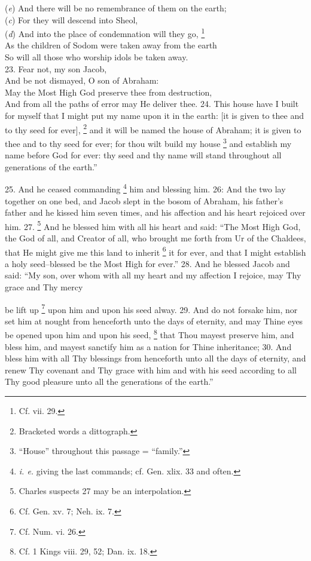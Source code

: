 (\emph{e}) And there will be no remembrance of them on the earth;\\
(\emph{c}) For they will descend into Sheol,\\
(\emph{d}) And into the place of condemnation will they go, \footnote{Cf. vii. 29.}\\
As the children of Sodom were taken away from the earth\\
So will all those who worship idols be taken away.\\
23. Fear not, my son Jacob,\\
And be not dismayed, O son of Abraham:\\
May the Most High God preserve thee from destruction,\\
And from all the paths of error may He deliver thee. 24. This house have I built for myself that I might put my name upon it in the earth: [it is given to thee and to thy seed for ever], \footnote{Bracketed words a dittograph.} and it will be named the house of Abraham; it is given to thee and to thy seed for ever; for thou wilt build my house \footnote{``House'' throughout this passage = ``family.''} and establish my name before God for ever: thy seed and thy name will stand throughout all generations of the earth.''

25. And he ceased commanding \footnote{\emph{i. e.} giving the last commands; cf. Gen. xlix. 33 and often.} him and blessing him. 26: And the two lay together on one bed, and Jacob slept in the bosom of Abraham, his father's father and he kissed him seven times, and his affection and his heart rejoiced over him. 27. \footnote{Charles suspects 27 may be an interpolation.} And he blessed him with all his heart and said: ``The Most High God, the God of all, and Creator of all, who brought me forth from Ur of the Chaldees, that He might give me this land to inherit \footnote{Cf. Gen. xv. 7; Neh. ix. 7.} it for ever, and that I might establish a holy seed--blessed be the Most High for ever.'' 28. And he blessed Jacob and said: ``My son, over whom with all my heart and my affection I rejoice, may Thy grace and Thy mercy

be lift up \footnote{Cf. Num. vi. 26.} upon him and upon his seed alway. 29. And do not forsake him, nor set him at nought from henceforth unto the days of eternity, and may Thine eyes be opened upon him and upon his seed, \footnote{Cf. 1 Kings viii. 29, 52; Dan. ix. 18.} that Thou mayest preserve him, and bless him, and mayest sanctify him as a nation for Thine inheritance; 30. And bless him with all Thy blessings from henceforth unto all the days of eternity, and renew Thy covenant and Thy grace with him and with his seed according to all Thy good pleasure unto all the generations of the earth.''

